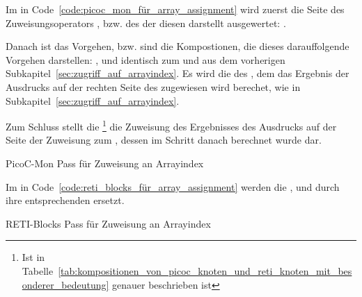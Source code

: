 Im  in Code~\ref{code:picoc_mon_für_array_assignment} wird zuerst die  Seite des  Zuweisungsoperators \smalltt{=}, bzw. des  der diesen darstellt ausgewertet: .

Danach ist das Vorgehen, bzw. sind die Kompostionen, die dieses darauffolgende Vorgehen darstellen: ,  und  identisch zum  und  aus dem vorherigen Subkapitel~\ref{sec:zugriff_auf_arrayindex}. Es wird die  des , dem das Ergebnis der Ausdrucks auf der rechten Seite des  \smalltt{=} zugewiesen wird berechet, wie in Subkapitel~\ref{sec:zugriff_auf_arrayindex}.

Zum Schluss stellt die  \footnote{Ist in Tabelle~\ref{tab:kompositionen_von_picoc_knoten_und_reti_knoten_mit_besonderer_bedeutung} genauer beschrieben ist} die Zuweisung \smalltt{=} des Ergebnisses des Ausdrucks auf der  Seite der Zuweisung zum , dessen  im Schritt danach berechnet wurde dar.

\begin{code}
  \centering
  \caption{PicoC-Mon Pass für Zuweisung an Arrayindex}
  \label{code:picoc_mon_für_array_assignment}
\end{code}

Im  in Code~\ref{code:reti_blocks_für_array_assignment} werden die  ,  und  durch ihre entsprechenden  ersetzt.

\begin{code}
  \centering
  \caption{RETI-Blocks Pass für Zuweisung an Arrayindex}
  \label{code:reti_blocks_für_array_assignment}
\end{code}
